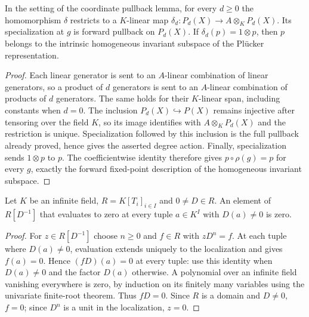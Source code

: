 \begin{lemma}
\label{lem:balanced-homogeneous-coaction}
\leanok
In the setting of the coordinate pullback lemma, for every $d\geq0$
the homomorphism $\delta$ restricts to a $K$-linear map
$\delta_d:P_d(X)\to A\otimes_K P_d(X)$.
Its specialization at $g$ is forward pullback on $P_d(X)$.
If $\delta_d(p)=1\otimes p$, then $p$ belongs to the intrinsic
homogeneous invariant subspace of the Pl\"ucker representation.
\end{lemma}
\begin{proof}
Each linear generator is sent to an $A$-linear combination of linear
generators, so a product of $d$ generators is sent to an $A$-linear
combination of products of $d$ generators. The same holds for their
$K$-linear span, including constants when $d=0$. The inclusion
$P_d(X)\hookrightarrow P(X)$ remains injective after tensoring over the
field $K$, so its image identifies with $A\otimes_K P_d(X)$ and the
restriction is unique. Specialization followed by this inclusion is the
full pullback already proved, hence gives the asserted degree action.
Finally, specialization sends $1\otimes p$ to $p$. The coefficientwise
identity therefore gives $p\circ\rho(g)=p$ for every $g$, exactly the
forward fixed-point description of the homogeneous invariant subspace.
\end{proof}

\begin{lemma}
\label{lem:balanced-localization-detection}
\leanok
Let $K$ be an infinite field, $R=K[T_i]_{i\in I}$ and $0\ne D\in R$.
An element of $R[D^{-1}]$ that evaluates to zero at every tuple
$a\in K^I$ with $D(a)\ne0$ is zero.
\end{lemma}
\begin{proof}
For $z\in R[D^{-1}]$ choose $n\geq0$ and $f\in R$ with $zD^n=f$.
At each tuple where $D(a)\ne0$, evaluation extends uniquely to the
localization and gives $f(a)=0$. Hence $(fD)(a)=0$ at every tuple:
use this identity when $D(a)\ne0$ and the factor $D(a)$ otherwise.
A polynomial over an infinite field vanishing everywhere is zero,
by induction on its finitely many variables using the univariate
finite-root theorem. Thus $fD=0$. Since $R$ is a domain and $D\ne0$,
$f=0$; since $D^n$ is a unit in the localization, $z=0$.
\end{proof}

